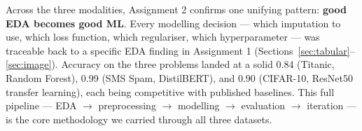 Across the three modalities, Assignment 2 confirms one unifying pattern: \textbf{good EDA becomes good ML}. Every modelling decision --- which imputation to use, which loss function, which regulariser, which hyperparameter --- was traceable back to a specific EDA finding in Assignment 1 (Sections~\ref{sec:tabular}--\ref{sec:image}). Accuracy on the three problems landed at a solid 0.84 (Titanic, Random Forest), 0.99 (SMS Spam, DistilBERT), and 0.90 (CIFAR-10, ResNet50 transfer learning), each being competitive with published baselines. This full pipeline --- EDA $\rightarrow$ preprocessing $\rightarrow$ modelling $\rightarrow$ evaluation $\rightarrow$ iteration --- is the core methodology we carried through all three datasets.
